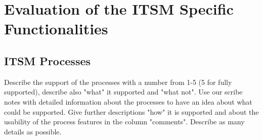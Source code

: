 \chapter{Evaluation of the ITSM Specific Functionalities}

\section{ITSM Processes}
\label{sec:itsmprocesses}

Describe the support of the processes with a number from 1-5 (5 for fully supported), describe also "what" it supported and "what not". Use our scribe notes with detailed information about the processes to have an idea about what could be supported. Give further descriptions "how" it is supported and about the usability of the process features in the column "comments". Describe as many details as possible.

